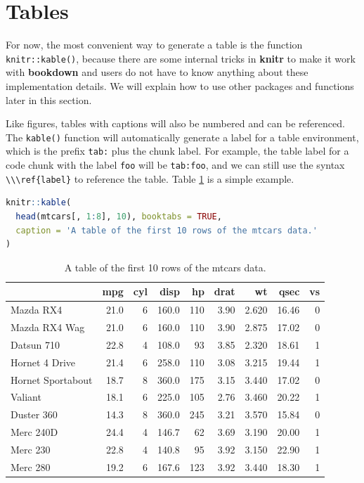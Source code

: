 \documentclass[doctor,openright,twoside]{sjtuthesis}
\newcommand{\passthrough}[1]{#1}
\theoremstyle{plain}
\theoremstyle{definition}
\theoremstyle{remark}
\theoremstyle{ocrenumbox}
\theoremstyle{plain}
\begin{document}
\hypertarget{tables}{%
\section{Tables}\label{tables}}

For now, the most convenient way to generate a table is the
function \passthrough{\lstinline!knitr::kable()!}, because there are
some internal tricks in \textbf{knitr} to make it work with
\textbf{bookdown} and users do not have to know anything about these
implementation details. We will explain how to use other packages and
functions later in this section.

Like figures, tables with captions will also be numbered and can be
referenced. The \passthrough{\lstinline!kable()!}
function will automatically generate a label for a table environment,
which is the prefix \passthrough{\lstinline!tab:!} plus the chunk label.
For example, the table label for a code chunk with the label
\passthrough{\lstinline!foo!} will be \passthrough{\lstinline!tab:foo!},
and we can still use the syntax \passthrough{\lstinline!\\\ref{label}!}
to reference the table. Table \ref{tab:table-single} is a simple
example.

\begin{lstlisting}[language=R]
knitr::kable(
  head(mtcars[, 1:8], 10), booktabs = TRUE,
  caption = 'A table of the first 10 rows of the mtcars data.'
)
\end{lstlisting}

\begin{table}

\caption{\label{tab:table-single}A table of the first 10 rows of the mtcars data.}
\centering
\begin{tabular}[t]{lrrrrrrrr}
\toprule
  & mpg & cyl & disp & hp & drat & wt & qsec & vs\\
\midrule
Mazda RX4 & 21.0 & 6 & 160.0 & 110 & 3.90 & 2.620 & 16.46 & 0\\
Mazda RX4 Wag & 21.0 & 6 & 160.0 & 110 & 3.90 & 2.875 & 17.02 & 0\\
Datsun 710 & 22.8 & 4 & 108.0 & 93 & 3.85 & 2.320 & 18.61 & 1\\
Hornet 4 Drive & 21.4 & 6 & 258.0 & 110 & 3.08 & 3.215 & 19.44 & 1\\
Hornet Sportabout & 18.7 & 8 & 360.0 & 175 & 3.15 & 3.440 & 17.02 & 0\\
\addlinespace
Valiant & 18.1 & 6 & 225.0 & 105 & 2.76 & 3.460 & 20.22 & 1\\
Duster 360 & 14.3 & 8 & 360.0 & 245 & 3.21 & 3.570 & 15.84 & 0\\
Merc 240D & 24.4 & 4 & 146.7 & 62 & 3.69 & 3.190 & 20.00 & 1\\
Merc 230 & 22.8 & 4 & 140.8 & 95 & 3.92 & 3.150 & 22.90 & 1\\
Merc 280 & 19.2 & 6 & 167.6 & 123 & 3.92 & 3.440 & 18.30 & 1\\
\bottomrule
\end{tabular}
\end{table}
\end{document}
